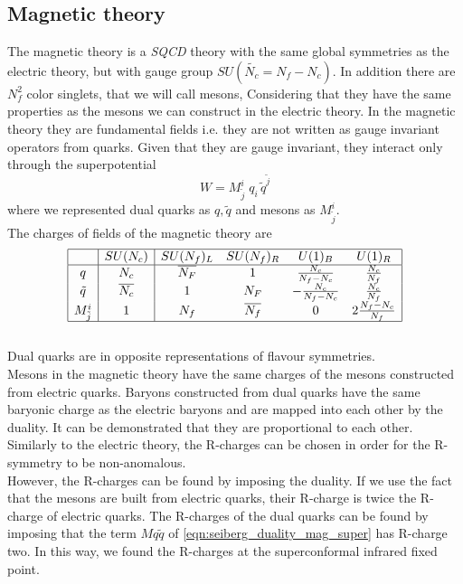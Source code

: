 \subsection{Magnetic theory}
The magnetic theory is a \emph{SQCD} theory with the same global symmetries as the electric theory, but with gauge group $SU(\tilde{N_c} = N_f - N_c)$. 
In addition there are $N_f^2$ color singlets, that we will call mesons, Considering that they have the same properties as the mesons we can construct in the electric theory.
In the magnetic theory they are fundamental fields i.e. they are not written as gauge invariant operators from quarks. 
Given that they are gauge invariant, they interact only through the superpotential
\begin{equation}
 W  = M^i_{\tilde{j}} \; q_i \, \tilde{q}^{\tilde{j}}
 \label{eqn:seiberg_duality_mag_super}
\end{equation}
where we represented dual quarks as $q,\tilde{q}$ and mesons as $M^i_{\tilde{j}} $.\\
The charges of fields of the magnetic theory are
\begin{equation}
 \begin{array}{| c | c |  c c c c |  }
 \hline
 & SU(N_c) & SU(N_f)_L  &SU(N_f)_R   & U(1)_B &  U(1)_R \\
\hline
q & N_c & \overline{N_F} & 1   &   \frac{N_c}{N_f-N_c}   &  \frac{N_c}{N_f}  \\
\tilde{q} &\overline{N_c}  &  1 & { N_F}   & - \frac{N_c}{N_f-N_c}   &   \frac{N_c}{N_f}   \\	 
M^i_{\tilde{j}}  &  1  & N_f & \overline{N_f}  & 0 &  2 \frac{N_f - N_c}{N_f}\\ 
\hline
 \end{array}
 \label{tab:sun_magnetich_charges}
\end{equation}\\
Dual quarks are in opposite representations of flavour symmetries. 
\\
Mesons in the magnetic theory have the same charges of the mesons constructed from electric quarks.
Baryons constructed from dual quarks have the same baryonic charge as the electric baryons and are mapped into each other by the duality.
It can be demonstrated that they are proportional to each other.\\
Similarly to the electric theory, the R-charges can be chosen in order for the R-symmetry to be non-anomalous.\\
However, the R-charges can be found by imposing the duality.
If we use the fact  that the mesons are built from electric quarks, their R-charge is twice the R-charge of electric quarks.
The R-charges of the dual quarks can be found by imposing that the term $M q \tilde{q}$ of \eqref{eqn:seiberg_duality_mag_super} has R-charge two.
In this way, we found the R-charges at the superconformal infrared fixed point.



